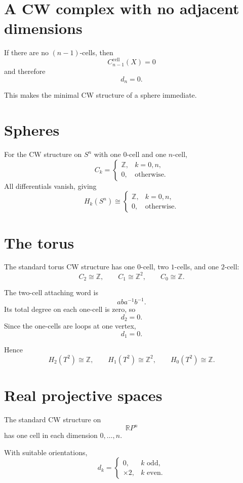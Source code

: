 \section{A CW complex with no adjacent dimensions}

If there are no \((n-1)\)-cells, then
\[
C_{n-1}^{\mathrm{cell}}(X)=0
\]
and therefore
\[
d_n=0.
\]

This makes the minimal CW structure of a sphere immediate.

\section{Spheres}

For the CW structure on \(S^n\) with one \(0\)-cell and one \(n\)-cell,
\[
C_k=
\begin{cases}
\mathbb Z,&k=0,n,\\
0,&\text{otherwise}.
\end{cases}
\]
All differentials vanish, giving
\[
H_k(S^n)\cong
\begin{cases}
\mathbb Z,&k=0,n,\\
0,&\text{otherwise}.
\end{cases}
\]

\section{The torus}

The standard torus CW structure has one \(0\)-cell, two \(1\)-cells, and one
\(2\)-cell:
\[
C_2\cong\mathbb Z,
\qquad
C_1\cong\mathbb Z^2,
\qquad
C_0\cong\mathbb Z.
\]

The two-cell attaching word is
\[
aba^{-1}b^{-1}.
\]
Its total degree on each one-cell is zero, so
\[
d_2=0.
\]
Since the one-cells are loops at one vertex,
\[
d_1=0.
\]

Hence
\[
H_2(T^2)\cong\mathbb Z,\qquad
H_1(T^2)\cong\mathbb Z^2,\qquad
H_0(T^2)\cong\mathbb Z.
\]

\section{Real projective spaces}

The standard CW structure on
\[
\mathbb RP^n
\]
has one cell in each dimension \(0,\dots,n\).

\begin{theorem}
\label{thm:viii18-rp-differential}
With suitable orientations,
\[
d_k=
\begin{cases}
0,&k\text{ odd},\\
\times2,&k\text{ even}.
\end{cases}
\]
\end{theorem}

